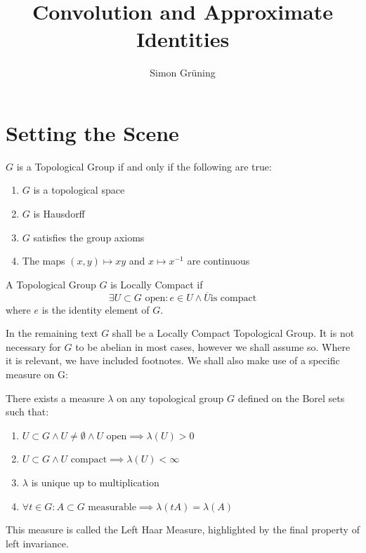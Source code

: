 


\title{Convolution and Approximate Identities}
\author{Simon Gr\"uning}
\address[Simon Gr\"uning]{University of Zurich, R\"{a}mistrasse 71, 8006 Zurich}

\maketitle


\section{Setting the Scene}

\begin{definition}
$G$ is a Topological Group if and only if the following are true:
\begin{enumerate}
\item $G$ is a topological space
\item $G$ is Hausdorff
\item $G$ satisfies the group axioms
\item The maps $ (x,y) \mapsto xy $ and $ x \mapsto x^{-1}$ are continuous
\end{enumerate}
\end{definition}

\begin{definition}
A Topological Group $G$ is Locally Compact if 
\begin{equation*}
\exists U \subset G \text{ open}: e \in U \wedge \overline{U} \text{is compact}
\end{equation*}
where $e$ is the identity element of $G$.
\end{definition}

In the remaining text $G$ shall be a Locally Compact Topological Group. It is not necessary for $G$ to be abelian in most cases, however we shall assume so. Where it is relevant, we have included footnotes. We shall also make use of a specific measure on G:

\begin{lemma}
There exists a measure $\lambda$ on any topological group $G$ defined on the Borel sets such that:
\begin{enumerate}
\item $U \subset G \wedge U \neq \emptyset \wedge U \text{ open} \implies \lambda(U) > 0$
\item $U \subset G \wedge U \text{ compact} \implies \lambda(U) < \infty$
\item $\lambda$ is unique up to multiplication
\item $\forall t \in G: A \subset G \text{ measurable} \implies \lambda(tA) = \lambda(A)$
\end{enumerate}
This measure is called the Left Haar Measure, highlighted by the final property of left invariance.
\end{lemma}

